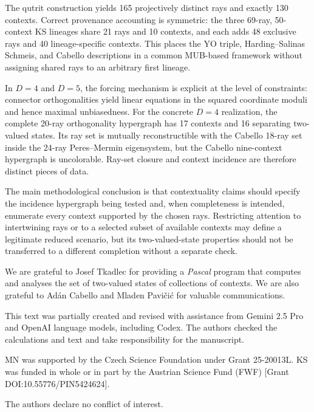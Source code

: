 \documentclass[%
  reprint,
  superscriptaddress,
  showpacs,
  showkeys,
  amsmath,amssymb,
  pra,
  longbibliography,
  floatfix,
  x11names
]{revtex4-2}
\newcommand{\rev}[1]{{\color{revisionblue}#1}}
\newenvironment{revision}{\begingroup\color{revisionblue}}{\endgroup}
\begin{document}
\begin{revision}
The qutrit construction yields 165 projectively distinct rays and exactly 130 contexts.  Correct provenance accounting is symmetric: the three 69-ray, 50-context KS lineages share 21 rays and 10 contexts, and each adds 48 exclusive rays and 40 lineage-specific contexts.  This places the YO triple, Harding--Salinas Schmeis, and Cabello descriptions in a common MUB-based framework without assigning shared rays to an arbitrary first lineage.

In $D=4$ and $D=5$, the forcing mechanism is explicit at the level of constraints: connector orthogonalities yield linear equations in the squared coordinate moduli and hence maximal unbiasedness.  For the concrete $D=4$ realization, the complete 20-ray orthogonality hypergraph has 17 contexts and 16 separating two-valued states.  Its ray set is mutually reconstructible with the Cabello 18-ray set inside the 24-ray Peres--Mermin eigensystem, but the Cabello nine-context hypergraph is uncolorable.  Ray-set closure and context incidence are therefore distinct pieces of data.

The main methodological conclusion is that contextuality claims should specify the incidence hypergraph being tested and, when completeness is intended, enumerate every context supported by the chosen rays.  Restricting attention to intertwining rays or to a selected subset of available contexts may define a legitimate reduced scenario, but its two-valued-state properties should not be transferred to a different completion without a separate check.
\end{revision}

\begin{acknowledgments}
We are grateful to Josef Tkadlec for providing a {\em Pascal} program that computes and analyses the set of two-valued states of collections of contexts.
We are also grateful to Ad\'{a}n Cabello and Mladen Pavi{\v{c}}i{\'{c}} for valuable communications.

\rev{This text was partially created and revised with assistance from Gemini 2.5 Pro and OpenAI language models, including Codex.  The authors checked the calculations and text and take responsibility for the manuscript.}

MN was supported by the Czech Science Foundation under Grant 25-20013L.
KS was funded in whole or in part by the Austrian Science Fund (FWF) [Grant DOI:10.55776/PIN5424624].

The authors declare no conflict of interest.
\end{acknowledgments}
\end{document}

